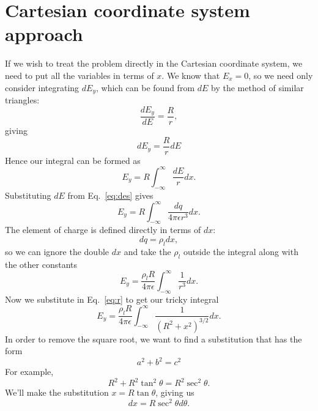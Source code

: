 \documentclass{tufte-handout}
\begin{document}
\section{Cartesian coordinate system approach}
\label{sec:cartesian}
If we wish to treat the problem directly in the Cartesian coordinate system, we need to put all the variables in terms of $x$. We know that $E_x = 0$, so we need only consider integrating $dE_y$, which can be found from $dE$ by the method of similar triangles:
\begin{equation}
\frac{dE_y}{dE}=\frac{R}{r}, 
\end{equation}
giving
\begin{equation}
dE_y=\frac{R}{r}dE 
\end{equation}
Hence our integral can be formed as
\begin{equation}
E_y = R \int_{-\infty}^{\infty} \frac{dE}{r} dx. 
\end{equation}
Substituting $dE$ from Eq.~\ref{eq:des} gives \marginnote{\[dE = \frac{dq}{4\pi\epsilon{}r^2}\]} 
\begin{equation}
E_y = R \int_{-\infty}^{\infty} \frac{dq}{4\pi\epsilon{}r^3} dx. 
\end{equation}
The element of charge is defined directly in terms of $dx$:
\begin{equation}
dq = \rho_l dx,
\end{equation}
so we can ignore the double $dx$ and take the $\rho_l$ outside the integral along with the other constants
\begin{equation}
E_y = \frac{\rho_lR}{4\pi\epsilon{}} \int_{-\infty}^{\infty} \frac{1}{r^3} dx. 
\end{equation}
Now we substitute in Eq.~\ref{eq:r} to get our tricky integral\marginnote{\[r = \sqrt{R^2 + x^2}\] }
\begin{equation}
\label{eq:eyc}
E_y = \frac{\rho_lR}{4\pi\epsilon{}} \int_{-\infty}^{\infty}\frac{1}{(R^2 + x^2)^{3/2}}dx.
\end{equation}
In order to remove the square root, we want to find a substitution that has the form 
\begin{equation*}
a^2 + b^2 = c^2
\end{equation*}
For example, 
\begin{equation}
R^2 + R^2\tan^2\theta = R^2\sec^2\theta.
\end{equation}
We'll make the substitution $x = R \tan\theta$, giving us
\begin{equation}
\label{eq:dxsub}
dx = R\sec^2\theta d\theta.
\end{equation}
\end{document}

